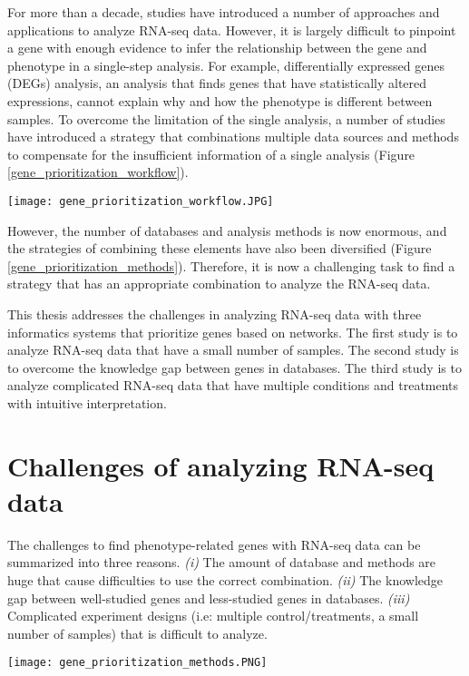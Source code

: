 \documentclass[oneside,phd]{snuthesis}
\begin{document}
For more than a decade, studies have introduced a number of approaches and applications to analyze RNA-seq data.
However, it is largely difficult to pinpoint a gene with enough evidence to infer the relationship between the gene and phenotype in a single-step analysis.
For example, differentially expressed genes (DEGs) analysis, an analysis that finds genes that have statistically altered expressions, cannot explain why and how the phenotype is different between samples.
To overcome the limitation of the single analysis, a number of studies have introduced a strategy that combinations multiple data sources and methods to compensate for the insufficient information of a single analysis (Figure \ref{gene_prioritization_workflow}).
\begin{figure*}
\begin{center}
\texttt{[image: gene\_prioritization\_workflow.JPG]}
\end{center}
\caption{Work flow for prioritizing genes (Moreau and Tranchevent, 2012)}
\label{gene_prioritization_workflow}
\end{figure*}

However, the number of databases and analysis methods is now enormous, and the strategies of combining these elements have also been diversified (Figure \ref{gene_prioritization_methods}). 
Therefore, it is now a challenging task to find a strategy that has an appropriate combination to analyze the RNA-seq data.

This thesis addresses the challenges in analyzing RNA-seq data with three informatics systems that prioritize genes based on networks. 
The first study is to analyze RNA-seq data that have a small number of samples. 
The second study is to overcome the knowledge gap between genes in databases. The third study is to analyze complicated RNA-seq data that have multiple conditions and treatments with intuitive interpretation.

\section{Challenges of analyzing RNA-seq data}

The challenges to find phenotype-related genes with RNA-seq data can be summarized into three reasons. 
\textit{(i)} 
The amount of database and methods are huge that cause difficulties to use the correct combination.
\textit{(ii)} 
The knowledge gap between well-studied genes and less-studied genes in databases.
\textit{(iii)} Complicated experiment designs (i.e: multiple control/treatments, a small number of samples) that is difficult to analyze.
\begin{figure*}
\begin{center}
\texttt{[image: gene\_prioritization\_methods.PNG]}
\end{center}
\caption{Various strategies to prioritize genes (Moreau and Tranchevent, 2012)}
\label{gene_prioritization_methods}
\end{figure*}
\end{document}
